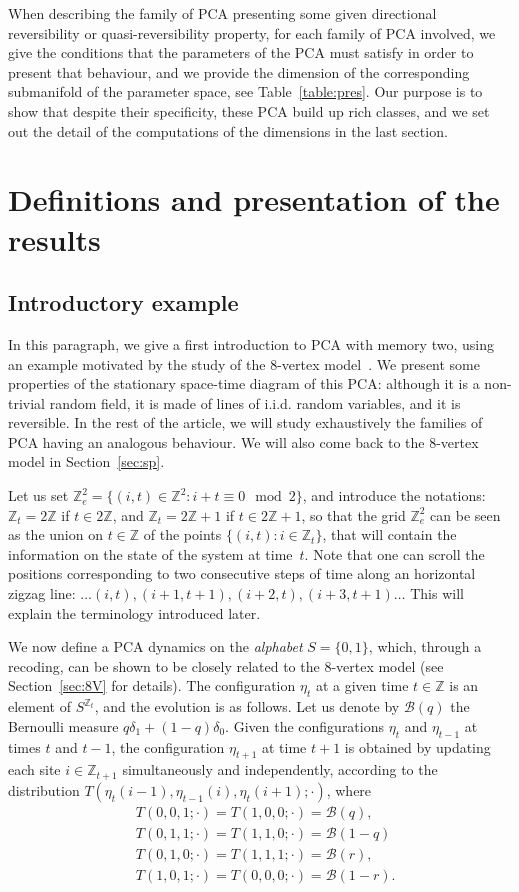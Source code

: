 \documentclass[10pt]{amsart}
\theoremstyle{definition}\newtheorem{defi}[theo]{Definition}\newtheorem{rema}[theo]{Remark}\newtheorem{exam}[theo]{Example}\newtheorem{exem}[theo]{Example}\newtheorem{nota}[theo]{Notation}
\newcounter{a}
\newcommand{\ZZ}{\mathbb{Z}}
\newcommand{\Z}{\mathbb{Z}}
\newcommand{\ber}{\mathcal{B}}
\begin{document}
When describing the family of PCA presenting some given directional reversibility or quasi-reversibility property, for each family of PCA involved, we give the conditions that the parameters of the PCA must satisfy in order to present that behaviour, and we provide the dimension of the corresponding submanifold of the parameter space, see Table~\ref{table:pres}. Our purpose is to show that despite their specificity, these PCA build up rich classes, and we set out the detail of the computations of the dimensions in the last section.

\section{Definitions and presentation of the results}\label{sec:introdef}

\subsection{Introductory example} \label{sec:introExample}

In this paragraph, we give a first introduction to PCA with memory two, using an example motivated by the study of the $8$-vertex model~\cite{Casse17}. We present some properties of the stationary space-time diagram of this PCA: although it is a non-trivial random field, it is made of lines of i.i.d. random variables, and it is reversible. In the rest of the article, we will study exhaustively the families of PCA having an analogous behaviour. We will also come back to the $8$-vertex model in Section~\ref{sec:sp}.

Let us set $\Z_{e}^2 = \{(i,t) \in \Z^2 : i+t \equiv 0 \mod 2\}$, and introduce the notations: $\Z_t=2\Z$ if $t\in 2\Z$, and $\Z_t=2\Z+1$ if $t\in 2\Z+1$, so that the grid $\Z_{e}^2$ can be seen as the union on $t\in\ZZ$ of the points $\{(i,t) : i\in\Z_t\}$, that will contain the information on the state of the system at time~$t$. Note that one can scroll the positions corresponding to two consecutive steps of time along an horizontal zigzag line: $\ldots(i,t), (i+1,t+1), (i+2,t), (i+3,t+1) \ldots $ This will explain the terminology introduced later.

We now define a PCA dynamics on the \emph{alphabet} $S=\{0,1\}$, which, through a recoding, can be shown to be closely related to the $8$-vertex model (see Section~\ref{sec:8V} for details). The configuration $\eta_t$ at a given time $t\in\Z$ is an element of $S^{\Z_t}$, and the evolution is as follows. Let us denote by $\ber(q)$ the Bernoulli measure $q\delta_1+(1-q)\delta_0$. Given the configurations $\eta_t$ and $\eta_{t-1}$ at times $t$ and $t-1$, the configuration $\eta_{t+1}$ at time $t+1$ is obtained by updating each site $i \in\Z_{t+1}$ simultaneously and independently, according to the distribution $T(\eta_t(i-1),\eta_{t-1}(i),\eta_{t}(i+1);\cdot)$, where
\begin{align*}
&T(0,0,1; \cdot)=T(1,0,0; \cdot)=\ber(q),\\
&T(0,1,1; \cdot)=T(1,1,0; \cdot)=\ber(1-q)\\
&T(0,1,0; \cdot)=T(1,1,1; \cdot)=\ber(r),\\
&T(1,0,1; \cdot)=T(0,0,0; \cdot)=\ber(1-r).
\end{align*}
\end{document}

